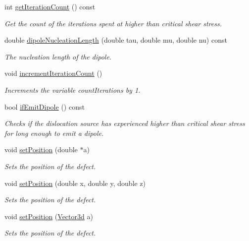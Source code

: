 \begin{DoxyCompactItemize}
int \hyperlink{classDislocationSource_a445cd1bf2354e388e66c588736ed6876}{get\-Iteration\-Count} () const 
\begin{DoxyCompactList}\small\item\em \-Get the count of the iterations spent at higher than critical shear stress. \end{DoxyCompactList}\item 
double \hyperlink{classDislocationSource_aeaea81924e840cc99ec1844dd72ab807}{dipole\-Nucleation\-Length} (double tau, double mu, double nu) const 
\begin{DoxyCompactList}\small\item\em \-The nucleation length of the dipole. \end{DoxyCompactList}\item 
void \hyperlink{classDislocationSource_a7934f1747dbde5dfe0ca7c2a6bac39ce}{increment\-Iteration\-Count} ()
\begin{DoxyCompactList}\small\item\em \-Increments the variable count\-Iterations by 1. \end{DoxyCompactList}\item 
bool \hyperlink{classDislocationSource_afcc06ad0c0152f15cea25317bebd13cb}{if\-Emit\-Dipole} () const 
\begin{DoxyCompactList}\small\item\em \-Checks if the dislocation source has experienced higher than critical shear stress for long enough to emit a dipole. \end{DoxyCompactList}\item 
void \hyperlink{classDefect_a2d233d13a8a93f6fba463a1fbc1c6c9f}{set\-Position} (double $\ast$a)
\begin{DoxyCompactList}\small\item\em \-Sets the position of the defect. \end{DoxyCompactList}\item 
void \hyperlink{classDefect_ad1a6acd8399d2ecabb7ce2b77623bbec}{set\-Position} (double x, double y, double z)
\begin{DoxyCompactList}\small\item\em \-Sets the position of the defect. \end{DoxyCompactList}\item 
void \hyperlink{classDefect_a36ffa9b4b01d38ed8a95ca2c78973cc4}{set\-Position} (\hyperlink{classVector3d}{\-Vector3d} a)
\begin{DoxyCompactList}\small\item\em \-Sets the position of the defect. \end{DoxyCompactList}\item 

\end{DoxyCompactItemize}
